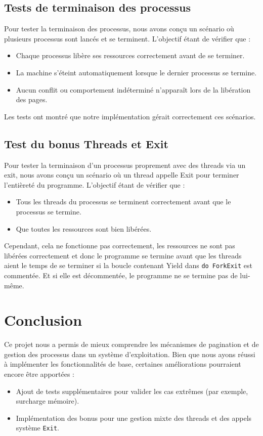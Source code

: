 \documentclass[a4paper,11pt]{article}
\begin{document}
\subsection{Tests de terminaison des processus}
Pour tester la terminaison des processus, nous avons conçu un scénario où plusieurs processus sont lancés et se terminent. L'objectif étant de vérifier que :
\begin{itemize}
    \item Chaque processus libère ses ressources correctement avant de se terminer.
    \item La machine s'éteint automatiquement lorsque le dernier processus se termine.
    \item Aucun conflit ou comportement indéterminé n'apparaît lors de la libération des pages.
\end{itemize}
Les tests ont montré que notre implémentation gérait correctement ces scénarios.

\subsection{Test du bonus Threads et Exit}
Pour tester la terminaison d'un processus proprement avec des threads via un exit, nous avons conçu un scénario où un thread appelle Exit pour terminer l'entièreté du programme. L'objectif étant de vérifier que :
\begin{itemize}
    \item Tous les threads du processus se terminent correctement avant que le processus se termine.
    \item Que toutes les ressources sont bien libérées.
\end{itemize}
Cependant, cela ne fonctionne pas correctement, les ressources ne sont pas libérées correctement et donc le programme se termine avant que les threads aient le temps de se terminer si la boucle contenant Yield dans \texttt{do ForkExit} est commentée. Et si elle est décommentée, le programme ne se termine pas de lui-même.

\section{Conclusion}
Ce projet nous a permis de mieux comprendre les mécanismes de pagination et de gestion des processus dans un système d'exploitation. Bien que nous ayons réussi à implémenter les fonctionnalités de base, certaines améliorations pourraient encore être apportées :
\begin{itemize}
    \item Ajout de tests supplémentaires pour valider les cas extrêmes (par exemple, surcharge mémoire).
    \item Implémentation des bonus pour une gestion mixte des threads et des appels système \texttt{Exit}.
\end{itemize}
\end{document}
